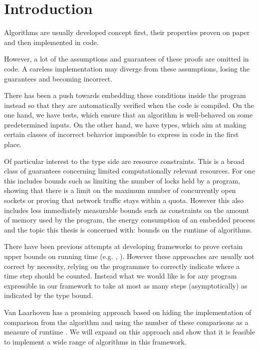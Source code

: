 
\chapter{Introduction}
Algorithms are usually developed concept first, their properties proven on paper and then implemented in code.

However, a lot of the assumptions and guarantees of these proofs are omitted in code. A careless implementation may diverge from these assumptions, losing the guarantees and becoming incorrect.

There has been a push towards embedding these conditions inside the program instead so that they are automatically verified when the code is compiled. On the one hand, we have tests, which ensure that an algorithm is well-behaved on some predetermined inputs. On the other hand, we have types, which aim at making certain classes of incorrect behavior impossible to express in code in the first place.

Of particular interest to the type side are resource constraints. This is a broad class of guarantees concerning limited computationally relevant resources. For one this includes bounds such as limiting the number of locks held by a program, showing that there is a limit on the maximum number of concurrently open sockets or proving that network traffic stays within a quota. However this also includes less immediately measurable bounds such as constraints on the amount of memory used by the program, the energy consumption of an embedded process and the topic this thesis is concerned with: bounds on the runtime of algorithms.

There have been previous attempts at developing frameworks to prove certain upper bounds on running time (e.g. \cite{danielsson:2008:time-complexity-analysis}, \cite{nipkow:2017:verified-root-balanced-trees}). However these approaches are usually not correct by necessity, relying on the programmer to correctly indicate where a time step should be counted. Instead what we would like is for any program expressible in our framework to take at most as many steps (asymptotically) as indicated by the type bound.

Van Laarhoven has a promising approach based on hiding the implementation of comparison from the algorithm and using the number of these comparisons as a measure of runtime \cite{laarhoven:2013:correctness-sorting}. We will expand on this approach and show that it is feasible to implement a wide range of algorithms in this framework.

